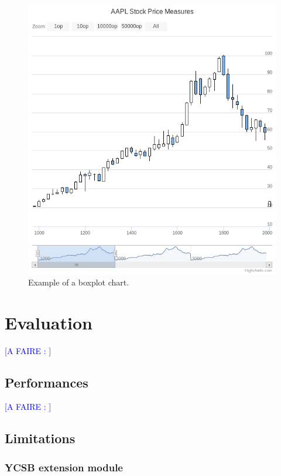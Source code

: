 \documentclass[a4paper,11pt]{report}
\newcommand*{\todo}[1]{\textcolor{blue}{[A FAIRE : \emph{#1}]}}
\begin{document}
\begin{figure}[ht]
\begin{center}
\includegraphics[width=1\linewidth]{images/boxplot.png}
\caption{Example of a boxplot chart.}
\label{boxplot}
\end{center}
\end{figure}

\chapter{Evaluation}

\todo{}

\section{Performances}

\todo{}

\section{Limitations}

\subsection{YCSB extension module}
\end{document}
